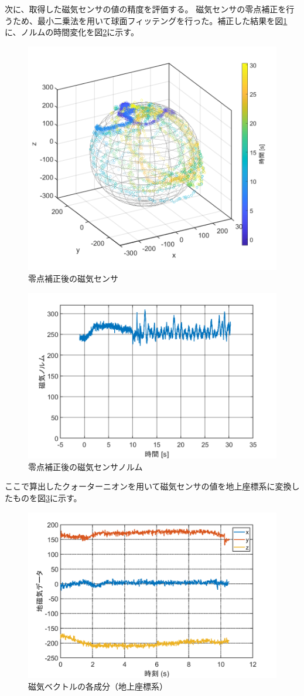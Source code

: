 \documentclass[a4paper,11pt,uplatex]{jsarticle}
\begin{document}
次に、取得した磁気センサの値の精度を評価する。
磁気センサの零点補正を行うため、最小二乗法を用いて球面フィッテングを行った。補正した結果を図\ref{fig:tiziki}に、ノルムの時間変化を図\ref{fig:tizikinorumu}に示す。


\begin{figure}[H]
	\centering
	\includegraphics[width=0.7\linewidth]{pic_sim/mag_fix.png}
	\caption{零点補正後の磁気センサ}
	\label{fig:tiziki}
\end{figure}
\begin{figure}[H]
	\centering
	\includegraphics[width=0.7\linewidth]{pic_sim/mag_norm.png}
	\caption{零点補正後の磁気センサノルム}
	\label{fig:tizikinorumu}
\end{figure}

ここで算出したクォーターニオンを用いて磁気センサの値を地上座標系に変換したものを図\ref{fig:tizikihennkann}に示す。

\begin{figure}[H]
	\centering
	\includegraphics[width=0.7\linewidth]{pic_sim/mag_tijou.png}
	\caption{磁気ベクトルの各成分（地上座標系）}
	\label{fig:tizikihennkann}
\end{figure}
\end{document}
